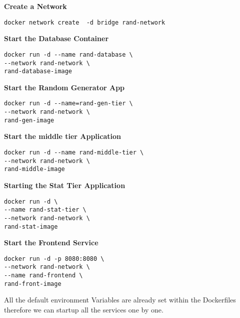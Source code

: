 \textbf{Create a Network}
\begin{verbatim}
docker network create  -d bridge rand-network
\end{verbatim}

\textbf{Start the Database Container}

\begin{verbatim}
docker run -d --name rand-database \
--network rand-network \
rand-database-image
\end{verbatim}

\textbf{Start the Random Generator App}
\begin{verbatim}
docker run -d --name=rand-gen-tier \
--network rand-network \
rand-gen-image
\end{verbatim}

\textbf{Start the middle tier Application}
\begin{verbatim}
docker run -d --name rand-middle-tier \
--network rand-network \
rand-middle-image
\end{verbatim}

\textbf{Starting the Stat Tier Application}
\begin{verbatim}
docker run -d \
--name rand-stat-tier \
--network rand-network \ 
rand-stat-image
\end{verbatim}

\textbf{Start the Frontend Service}
\begin{verbatim}
docker run -d -p 8080:8080 \
--network rand-network \
--name rand-frontend \
rand-front-image
\end{verbatim}

All the default environment Variables are already set within the Dockerfiles therefore we can startup all the services one by one.
